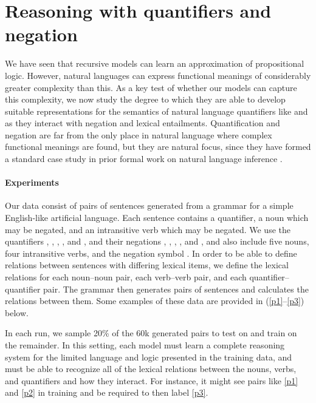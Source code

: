 \section{Reasoning with quantifiers and negation}\label{sec:quantifiers}

We have seen that recursive models can learn an approximation of propositional
logic.  However, natural languages can express functional meanings of
considerably greater complexity than this.  As a key test of whether our models 
can capture this complexity, we now study the degree to which they are able to
develop suitable representations for the semantics of natural language
quantifiers like  and  as they interact with negation and lexical entailments. Quantification 
and negation are far from the only place in natural language where complex functional meanings
are found, but they are natural focus, since they have
formed a standard case study in prior formal work on natural
language inference \cite{Icard:Moss:2013:LILT}.

\paragraph{Experiments}
Our data consist of pairs of sentences generated
from a grammar for a simple English-like artificial language.
Each sentence contains a quantifier, a noun
which may be negated, and an intransitive verb which may be
negated. We use the quantifiers , , ,
, and , and their negations , ,
, , and , and also
include five nouns, four intransitive verbs, and the negation symbol
. In order to be able to define relations between sentences
with differing lexical items, we define the lexical relations for
each noun--noun pair, each verb--verb pair, and each
quantifier--quantifier pair. The grammar then generates pairs of
sentences and calculates the relations
between them.  
Some examples of these data are provided in (\ref{p1}--\ref{p3}) below.


















In each run, we sample 20\% of the 60k generated pairs to test on and 
train on the remainder. In this setting, each model must learn a
complete reasoning system for the limited language and logic presented
in the training data, and must be able
to recognize all of the lexical relations between the nouns, verbs,
and quantifiers and how they interact. For instance, it might see
pairs like \eqref{p1} and \eqref{p2} in training and be required to 
then label \eqref{p3}.

